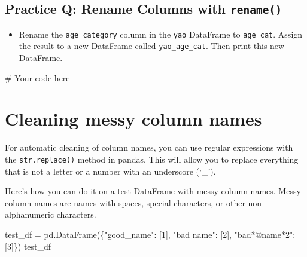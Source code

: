 \documentclass[
  letterpaper,
  DIV=11,
  numbers=noendperiod]{scrreprt}
\newenvironment{Shaded}{\begin{snugshade}}{\end{snugshade}}
\newcommand{\CommentTok}[1]{\textcolor[rgb]{0.37,0.37,0.37}{#1}}
\newcommand{\DecValTok}[1]{\textcolor[rgb]{0.68,0.00,0.00}{#1}}
\newcommand{\NormalTok}[1]{\textcolor[rgb]{0.00,0.23,0.31}{#1}}
\newcommand{\OperatorTok}[1]{\textcolor[rgb]{0.37,0.37,0.37}{#1}}
\newcommand{\StringTok}[1]{\textcolor[rgb]{0.13,0.47,0.30}{#1}}
\providecommand{\tightlist}{%
  \setlength{\itemsep}{0pt}\setlength{\parskip}{0pt}}\usepackage{longtable,booktabs,array}
\begin{document}
\begin{tcolorbox}[enhanced jigsaw, colframe=quarto-callout-tip-color-frame, opacityback=0, titlerule=0mm, bottomrule=.15mm, breakable, leftrule=.75mm, colbacktitle=quarto-callout-tip-color!10!white, title=\textcolor{quarto-callout-tip-color}{\faLightbulb}\hspace{0.5em}{Practice}, rightrule=.15mm, coltitle=black, opacitybacktitle=0.6, colback=white, left=2mm, arc=.35mm, toptitle=1mm, bottomtitle=1mm, toprule=.15mm]

\subsection{\texorpdfstring{Practice Q: Rename Columns with
\texttt{rename()}}{Practice Q: Rename Columns with rename()}}\label{practice-q-rename-columns-with-rename}

\begin{itemize}
\tightlist
\item
  Rename the \texttt{age\_category} column in the \texttt{yao} DataFrame
  to \texttt{age\_cat}. Assign the result to a new DataFrame called
  \texttt{yao\_age\_cat}. Then print this new DataFrame.
\end{itemize}

\begin{Shaded}
\begin{Highlighting}[]
\CommentTok{\# Your code here}
\end{Highlighting}
\end{Shaded}

\end{tcolorbox}

\section{Cleaning messy column names}\label{cleaning-messy-column-names}

For automatic cleaning of column names, you can use regular expressions
with the \texttt{str.replace()} method in pandas. This will allow you to
replace everything that is not a letter or a number with an underscore
(`\_').

Here's how you can do it on a test DataFrame with messy column names.
Messy column names are names with spaces, special characters, or other
non-alphanumeric characters.

\begin{Shaded}
\begin{Highlighting}[]
\NormalTok{test\_df }\OperatorTok{=}\NormalTok{ pd.DataFrame(\{}\StringTok{"good\_name"}\NormalTok{: [}\DecValTok{1}\NormalTok{], }\StringTok{"bad name"}\NormalTok{: [}\DecValTok{2}\NormalTok{], }\StringTok{"bad*@name*2"}\NormalTok{: [}\DecValTok{3}\NormalTok{]\})}
\NormalTok{test\_df}
\end{Highlighting}
\end{Shaded}
\end{document}
